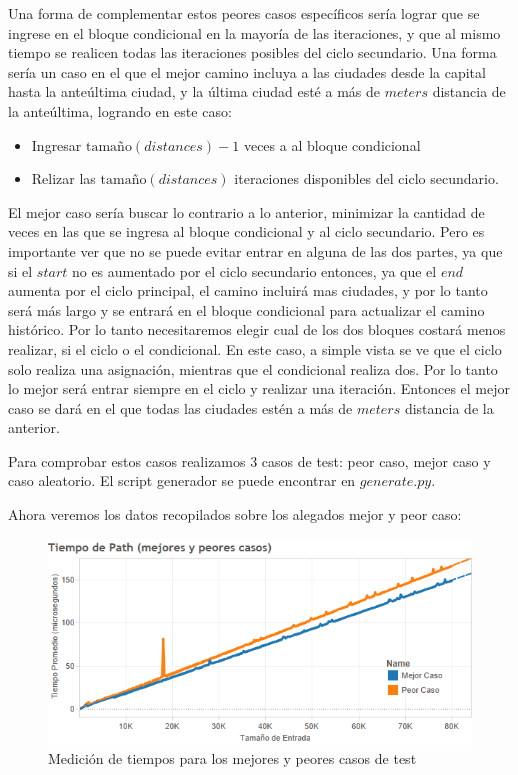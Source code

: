 \documentclass{article}
\theoremstyle{definition}
\theoremstyle{remark}
\begin{document}
Una forma de complementar estos peores casos específicos sería lograr que se ingrese en el bloque condicional en la mayoría de las iteraciones, y que al mismo tiempo se realicen todas las iteraciones posibles del ciclo secundario. Una forma sería un caso en el que el mejor camino incluya a las ciudades desde la capital hasta la anteúltima ciudad, y la última ciudad esté a más de $meters$ distancia de la anteúltima, logrando en este caso:
\begin{itemize}
\item Ingresar $\text{tamaño}(distances)-1$ veces a al bloque condicional
\item Relizar las $\text{tamaño}(distances)$ iteraciones disponibles del ciclo secundario.
\end{itemize}
\newline
El mejor caso sería buscar lo contrario a lo anterior, minimizar la cantidad de veces en las que se ingresa al bloque condicional y al ciclo secundario. Pero es importante ver que no se puede evitar entrar en alguna de las dos partes, ya que si el $start$ no es aumentado por el ciclo secundario entonces, ya que el $end$ aumenta por el ciclo principal, el camino incluirá mas ciudades, y por lo tanto será más largo y se entrará en el bloque condicional para actualizar el camino histórico. Por lo tanto necesitaremos elegir cual de los dos bloques costará menos realizar, si el ciclo o el condicional. En este caso, a simple vista se ve que el ciclo solo realiza una asignación, mientras que el condicional realiza dos. Por lo tanto lo mejor será entrar siempre en el ciclo y realizar una iteración. Entonces el mejor caso se dará en el que todas las ciudades estén a más de $meters$ distancia de la anterior.

Para comprobar estos casos realizamos 3 casos de test: peor caso, mejor caso y caso aleatorio. El script generador se puede encontrar en $generate.py$.

Ahora veremos los datos recopilados sobre los alegados mejor y peor caso:

\begin{figure}[]
\centering
\includegraphics[scale=0.5]{docs/images/ex1-best-worst.png}
\caption{Medición de tiempos para los mejores y peores casos de test}
\label{exp1plot}
\end{figure}
\end{document}
